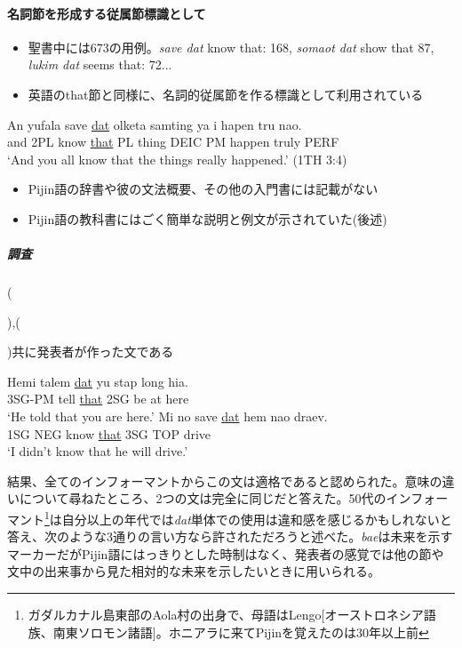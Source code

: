 \documentclass[11pt,a4paper]{jsarticle}
\newcounter{tempcnt}
\newcommand{\exn}[1]{%
\setcounter{tempcnt}{\value{exx}}%
\addtocounter{tempcnt}{#1}%
\arabic{tempcnt}}
\begin{document}
\paragraph{名詞節を形成する従属節標識として}
\begin{itemize}
  \item 聖書中には673の用例。\textit{save dat} know that: 168, \textit{somaot dat} show that 87, \textit{lukim dat} seems that: 72...
  \item 英語のthat節と同様に、名詞的従属節を作る標識として利用されている
\end{itemize}
\begin{exe}
\ex
\gll An yufala save \underline{dat} olketa samting ya i hapen tru nao.\\
and 2PL know \underline{that} PL thing DEIC PM happen truly PERF\\
\glt `And you all know that the things really happened.' (1TH 3:4)
\end{exe}
\begin{itemize}
  \item Pijin語の辞書\cite{dictionary}や彼の文法概要\cite{syntax}、その他の入門書\cite{yumi}には記載がない
  \item Pijin語の教科書\cite{eric}にはごく簡単な説明と例文が示されていた(後述)
\end{itemize}
\subparagraph{調査}
(\exn{1}),(\exn{2})共に発表者が作った文である
\begin{exe}
\ex\label{dat1}
\gll Hemi talem \underline{dat} yu stap long hia.\\
3SG-PM tell \underline{that} 2SG be at here\\
\glt `He told that you are here.'
\ex\label{dat2}
\gll Mi no save \underline{dat} hem nao draev.\\
1SG NEG know \underline{that} 3SG TOP drive\\
\glt `I didn't know that he will drive.'
\end{exe}

結果、全てのインフォーマントからこの文は適格であると認められた。意味の違いについて尋ねたところ、2つの文は完全に同じだと答えた。50代のインフォーマント\footnote{ガダルカナル島東部のAola村の出身で、母語はLengo[オーストロネシア語族、南東ソロモン諸語]。ホニアラに来てPijinを覚えたのは30年以上前}は自分以上の年代では\textit{dat}単体での使用は違和感を感じるかもしれないと答え、次のような3通りの言い方なら許されただろうと述べた。\textit{bae}は未来を示すマーカーだがPijin語にはっきりとした時制はなく\citep{eric}、発表者の感覚では他の節や文中の出来事から見た相対的な未来を示したいときに用いられる。
\end{document}
